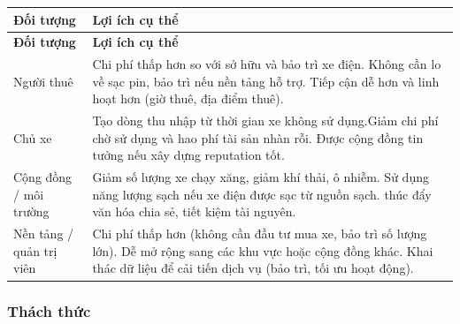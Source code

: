 \renewcommand{\arraystretch}{1.5} %
\begin{longtable}{|>{\raggedright\arraybackslash}p{2.5cm}|>{\raggedright\arraybackslash}p{13cm}|}
\hline
\textbf{Đối tượng} & \textbf{Lợi ích cụ thể} \\ \hline
\endfirsthead
\hline
\textbf{Đối tượng} & \textbf{Lợi ích cụ thể} \\ \hline
\endhead

Người thuê & Chi phí thấp hơn so với sở hữu và bảo trì xe điện. \newline Không cần lo về sạc pin, bảo trì nếu nền tảng hỗ trợ.  \newline Tiếp cận dễ hơn và linh hoạt hơn (giờ thuê, địa điểm thuê). \\ \hline
Chủ xe & Tạo dòng thu nhập từ thời gian xe không sử dụng.\newline Giảm chi phí chờ sử dụng và hao phí tài sản nhàn rỗi. \newline Được cộng đồng tin tưởng nếu xây dựng reputation tốt. \\ \hline
Cộng đồng / môi trường & Giảm số lượng xe chạy xăng, giảm khí thải, ô nhiễm. \newline Sử dụng năng lượng sạch nếu xe điện được sạc từ nguồn sạch. \newline thúc đẩy văn hóa chia sẻ, tiết kiệm tài nguyên. \\ \hline
Nền tảng / quản trị viên & Chi phí thấp hơn (không cần đầu tư mua xe, bảo trì số lượng lớn). \newline Dễ mở rộng sang các khu vực hoặc cộng đồng khác. \newline Khai thác dữ liệu để cải tiến dịch vụ (bảo trì, tối ưu hoạt động). \\ \hline

\end{longtable}

\vspace{0.5cm}
\subsubsection*{Thách thức}

